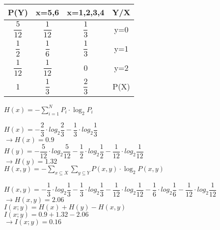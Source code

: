 \def \Subject {}


\section{\Subject}

\begin{table}[h!]
\centering
\begin{tabular}{||c c c||c||} 
 \hline
 P(Y) & x=5,6 & x=1,2,3,4 & Y/X \\ [0.5ex] 
 \hline\hline
 $\dfrac{5}{12}$ & $\dfrac{1}{12}$  & $\dfrac{1}{3}$  & y=0 \\ 
 $\dfrac{1}{2}$ & $\dfrac{1}{6}$ & $\dfrac{1}{3}$ & y=1 \\
 $\dfrac{1}{12}$ & $\dfrac{1}{12}$ & 0 & y=2 \\
 1 & $\dfrac{1}{3}$ & $\dfrac{2}{3}$  & P(X) \\ [1ex] 
 \hline
\end{tabular}
\end{table}


 \null \hfill $ H(x) = -\sum_{i=1}^{N}  P_i \cdot \log_{2} P_i $
 


\null \hfill $ H(x) = -  \dfrac{2}{3} \cdot log_{2} \dfrac{2}{3} - \dfrac{1}{3} \cdot log_{2} \dfrac{1}{3}  $\\
\null \hfill $ \rightarrow H(x) =  0.9 $ \\

\null \hfill $ H(y) = -  \dfrac{5}{12} \cdot log_{2} \dfrac{5}{12} - \dfrac{1}{2} \cdot log_{2} \dfrac{1}{2} - \dfrac{1}{12} \cdot log_{2} \dfrac{1}{12}  $\\
\null \hfill $ \rightarrow H(y) = 1.32 $ \\

 \null \hfill $ H(x,y) = -\sum_{x \subseteq X}\sum_{y \subseteq Y}  P(x,y) \cdot \log_{2} P(x,y) $

\null \hfill $ H(x,y) = -  \dfrac{1}{3} \cdot log_{2} \dfrac{1}{3} - \dfrac{1}{3} \cdot log_{2} \dfrac{1}{3} - \dfrac{1}{12} \cdot log_{2} \dfrac{1}{12} - \dfrac{1}{6} \cdot log_{2} \dfrac{1}{6} - \dfrac{1}{12} \cdot log_{2} \dfrac{1}{12}  $\\
\null \hfill $ \rightarrow   H(x,y) = 2.06 $ \\

    \null \hfill $ I(x;y) = H(x) + H(y) - H(x,y) $ \\
    \null \hfill $ I(x;y) = 0.9 + 1.32 - 2.06 $ \\
\null \hfill $ \rightarrow I(x;y) = 0.16 $ \\
